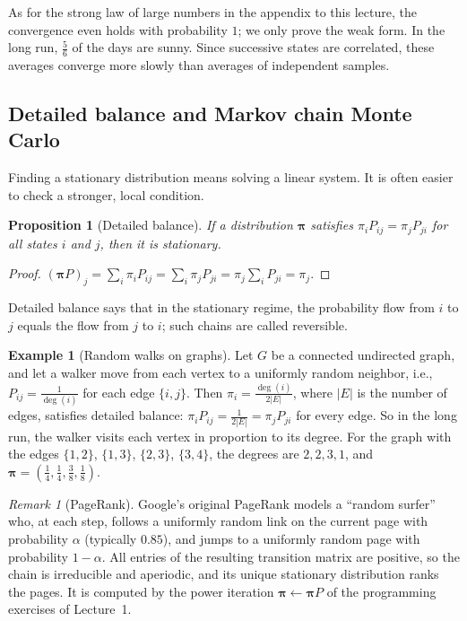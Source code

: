 \documentclass[11pt]{article}
\theoremstyle{definition}
\newtheorem{example}[definition]{Example}
\theoremstyle{plain}
\newtheorem{proposition}[definition]{Proposition}
\theoremstyle{remark}
\newtheorem{remark}[definition]{Remark}
\begin{document}
As for the strong law of large numbers in the appendix to this lecture, the convergence even holds with probability $1$; we only prove the weak form. In the long run, $\frac{5}{6}$ of the days are sunny. Since successive states are correlated, these averages converge more slowly than averages of independent samples.

\subsection{Detailed balance and Markov chain Monte Carlo}

Finding a stationary distribution means solving a linear system. It is often easier to check a stronger, local condition.

\begin{proposition}[Detailed balance]\label{prop:detailed-balance}
    If a distribution $\boldsymbol{\pi}$ satisfies $\pi_i P_{ij} = \pi_j P_{ji}$ for all states $i$ and $j$, then it is stationary.
\end{proposition}

\begin{proof}
    $(\boldsymbol{\pi}P)_j = \sum_i \pi_i P_{ij} = \sum_i \pi_j P_{ji} = \pi_j\sum_i P_{ji} = \pi_j$.
\end{proof}

Detailed balance says that in the stationary regime, the probability flow from $i$ to $j$ equals the flow from $j$ to $i$; such chains are called reversible.

\begin{example}[Random walks on graphs]\label{ex:random-walk-graph}
    Let $G$ be a connected undirected graph, and let a walker move from each vertex to a uniformly random neighbor, i.e., $P_{ij} = \frac{1}{\deg(i)}$ for each edge $\{i, j\}$. Then $\pi_i = \frac{\deg(i)}{2|E|}$, where $|E|$ is the number of edges, satisfies detailed balance: $\pi_i P_{ij} = \frac{1}{2|E|} = \pi_j P_{ji}$ for every edge. So in the long run, the walker visits each vertex in proportion to its degree. For the graph with the edges $\{1, 2\}$, $\{1, 3\}$, $\{2, 3\}$, $\{3, 4\}$, the degrees are $2, 2, 3, 1$, and $\boldsymbol{\pi} = (\frac{1}{4}, \frac{1}{4}, \frac{3}{8}, \frac{1}{8})$.
\end{example}

\begin{remark}[PageRank]
    Google's original PageRank models a ``random surfer'' who, at each step, follows a uniformly random link on the current page with probability $\alpha$ (typically $0.85$), and jumps to a uniformly random page with probability $1 - \alpha$. All entries of the resulting transition matrix are positive, so the chain is irreducible and aperiodic, and its unique stationary distribution ranks the pages. It is computed by the power iteration $\boldsymbol{\pi} \leftarrow \boldsymbol{\pi}P$ of the programming exercises of Lecture~1.
\end{remark}
\end{document}
